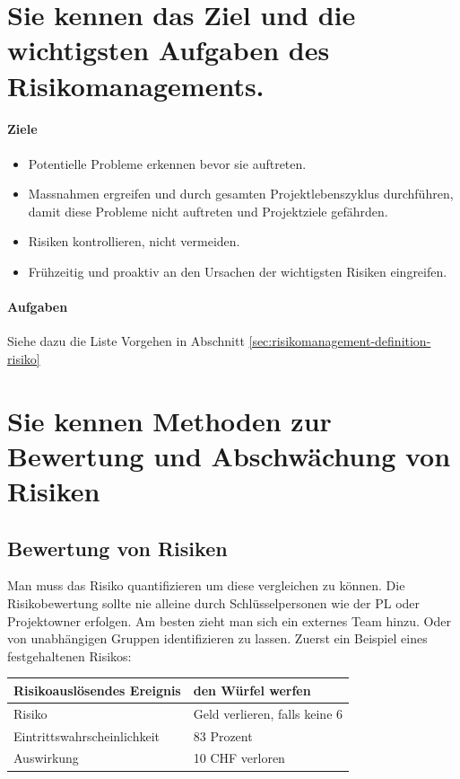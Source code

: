 \section{Sie kennen das Ziel und die wichtigsten Aufgaben des Risikomanagements.}

\paragraph{Ziele}
\begin{itemize}
	\item Potentielle Probleme erkennen bevor sie auftreten.
	\item Massnahmen ergreifen und durch gesamten Projektlebenszyklus durchführen, damit diese Probleme nicht auftreten und Projektziele gefährden.
	\item Risiken kontrollieren, nicht vermeiden.
	\item Frühzeitig und proaktiv an den Ursachen der wichtigsten Risiken eingreifen.
\end{itemize}

\paragraph{Aufgaben}
Siehe dazu die Liste Vorgehen in Abschnitt \ref{sec:risikomanagement-definition-risiko}


\section{Sie kennen Methoden zur Bewertung und Abschwächung von Risiken}

\subsection{Bewertung von Risiken}

Man muss das Risiko quantifizieren um diese vergleichen zu können. Die Risikobewertung sollte nie alleine durch Schlüsselpersonen wie der PL oder Projektowner erfolgen. Am besten zieht man sich ein externes Team hinzu. Oder von unabhängigen Gruppen identifizieren zu lassen. Zuerst ein Beispiel eines festgehaltenen Risikos:
\vfill
\begin{tabular}{|p{7cm}|p{7cm}|}
	\hline Risikoauslösendes Ereignis &  den Würfel werfen \\ 
	\hline Risiko & Geld verlieren, falls keine 6  \\ 
	\hline Eintrittswahrscheinlichkeit & 83 Prozent \\ 
	\hline Auswirkung & 10 CHF verloren \\ 
	\hline 
\end{tabular}

